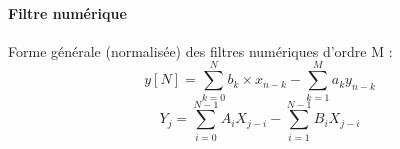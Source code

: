 \documentclass{article}
\begin{document}











    \paragraph{Filtre numérique}
    Forme générale (normalisée) des filtres numériques d'ordre M :
    $$ y[N] = \sum\limits_{k=0}^{N} b_k \times x_{n-k} - \sum\limits_{k=1}^{M} a_k y_{n-k} $$
    $$ Y_j = \sum\limits_{i=0}^{N-1} A_i X_{j-i} - \sum\limits_{i=1}^{N-1} B_i X_{j-i} $$
\end{document}
